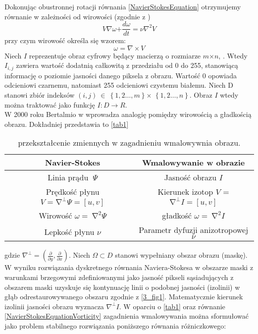 \documentclass[12pt, twoside, openany]{report}
\theoremstyle{definition}
\begin{document}
Dokonując obustronnej rotacji równania \eqref{NavierStokesEquation} otrzymujemy równanie w zależności od wirowości (zgodnie z \cite{StreamfuntionVorticityForm})
\begin{equation}
V\nabla \omega \mathrm{+}\frac{d\omega }{dt}\mathrm{=}\nu {\nabla }^{\mathrm{2}}V
\label{NavierStokesEquationVorticity}
\end{equation}
przy czym wirowość określa się wzorem:
\begin{equation}
\omega =\nabla \times V
\label{Vorticity}
\end{equation}
Niech $I$ reprezentuje obraz cyfrowy będący macierzą o rozmiarze $m \mathrm{\times} n$, \cite{ebrahimi2012navier}. Wtedy $I_{i,j}$ zawiera wartość dodatnią całkowitą z przedziału od 0 do 255, stanowiącą informację o poziomie jasności danego piksela z obrazu. Wartość 0 opowiada odcieniowi czarnemu, natomiast 255 odcieniowi czystemu białemu. Niech D stanowi zbiór indeksów $(i,j)\ \in \ \left\{1,2\dots ,m\right\} \mathrm{\times}$ $\left\{1,2\dots ,n\right\}$. Obraz $I$ wtedy można traktować jako funkcję $I:D\to R$. \\
W 2000 roku Bertalmio w \cite{BertalmioNavierStokes} wprowadza analogię pomiędzy wirowością a gładkością obrazu. Dokładniej przedstawia to \autoref{tab1}
\begin{table}[!h]
	\centering
	\begin{tabular}{|cc|c|}
	\hline \hline

		& Navier-Stokes
		& Wmalowywanie w obrazie\\ \hline
		
		& Linia prądu $\ \mathit{\Psi}$ &  Jasność obrazu $I$ \\ \hline
	
		& Prędkość płynu $V = {\mathrm{\nabla }}^{\bot }\mathit{\Psi} = [u, v]$  & Kierunek izotop $V$ = ${\mathrm{\nabla }}^{\bot }I = [u, v]$ \\ \hline
		& Wirowość $\omega =\ {\mathrm{\nabla }}^2\mathit{\Psi}$ & gładkość $\omega =\ {\mathrm{\nabla }}^2I$ \\ \hline
		
		& Lepkość płynu $\nu $ & Parametr dyfuzji anizotropowej $\nu $ \\
	\hline
	\end{tabular}
	\caption{przekształcenie zmiennych w zagadnieniu wmalowywnia obrazu.}
	\label{tab1}
\end{table}
gdzie ${\nabla }^{\bot }=(\frac{\partial }{\partial y},\frac{\partial }{\partial x})$.
Niech $\mathit{\Omega}\subset D$ stanowi wypełniany obszar obrazu (maskę). W wyniku rozwiązania dyskretnego równania Naviera-Stokesa w obszarze maski z warunkami brzegowymi zdefiniowanymi jako jasność pikseli sąsiadujących z obszarem maski uzyskuje się kontynuację linii o podobnej jasności (izolinii) w głąb odrestaurowywanego obszaru zgodnie z \autoref{3_fig1}.  Matematycznie kierunek izolinii jasności obrazu wyznacza ${\nabla }^{\bot }I$. W oparciu o \autoref{tab1} oraz równanie  \eqref{NavierStokesEquationVorticity} zagadnienia wmalowywania można sformułować jako problem stabilnego rozwiązania poniższego równania różniczkowego:
\end{document}
